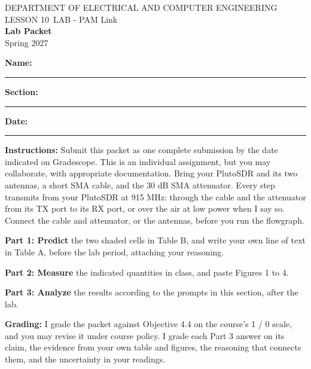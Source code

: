 \documentclass{exam}
\def\labLesson{10}
\def\thisterm{\thisTermIn}
\def\thisterm{Spring 2027}
\begin{document}
\pagestyle{headandfoot}
\begin{Form}

\begin{center}
DEPARTMENT OF ELECTRICAL AND COMPUTER ENGINEERING \\
LESSON \labLesson\ LAB - PAM Link \\
\textbf{Lab Packet} \\
\thisterm \\[4mm]
\end{center}

\vspace{-4pt}
\textbf{Name:} \rule[-2pt]{2.6in}{0.4pt} \hfill
\textbf{Section:} \rule[-2pt]{0.9in}{0.4pt} \hfill
\textbf{Date:} \rule[-2pt]{1.1in}{0.4pt}

\vspace{4pt}


\textbf{Instructions:} Submit this packet as one complete submission by the date indicated on
Gradescope. This is an individual assignment, but you may collaborate, with appropriate
documentation. Bring your PlutoSDR and its two antennas, a short SMA cable, and the 30 dB SMA
attenuator. Every step transmits from your PlutoSDR at 915 MHz: through the cable and the
attenuator from its TX port to its RX port, or over the air at low power when I say so.
Connect the cable and attenuator, or the antennas, before you run the flowgraph.

\textbf{Part 1: Predict} the two shaded cells in Table B, and write your own line of text in
Table A, before the lab period, attaching your reasoning.

\textbf{Part 2: Measure} the indicated quantities in class, and paste Figures 1 to 4.

\textbf{Part 3: Analyze} the results according to the prompts in this section, after the lab.

\textbf{Grading:} I grade the packet against Objective 4.4 on the course's 1 / 0 scale, and you
may revise it under course policy. I grade each Part 3 answer on its claim, the evidence from
your own table and figures, the reasoning that connects them, and the uncertainty in your
readings.

\begin{procbox}
\end{procbox}


\end{Form}
\end{document}
